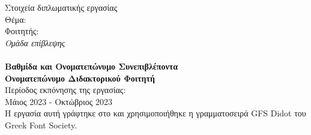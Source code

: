 
\pagestyle{empty}
\begin{center}
\Large{Στοιχεία διπλωματικής εργασίας}\\[1cm]
{\large Θέμα:}
\textbf{\large \doctitle}\\[1cm]
\large {Φοιτητής: \textbf{\nomme}\\[1cm]
\emph{\large{Ομάδα επίβλεψης}}\\[0.3cm]
\textbf{\supname}\\
\textbf{Βαθμίδα και Ονοματεπώνυμο Συνεπιβλέποντα}\\
\textbf{Ονοματεπώνυμο Διδακτορικού Φοιτητή}\\[1cm]
Περίοδος εκπόνησης της εργασίας:\\ Μάιος 2023 - Οκτώβριος 2023\\[1cm]
Η εργασία αυτή γράφτηκε στο \XeLaTeX{} και χρησιμοποιήθηκε η γραμματοσειρά GFS Didot του Greek Font Society.}
\end{center}